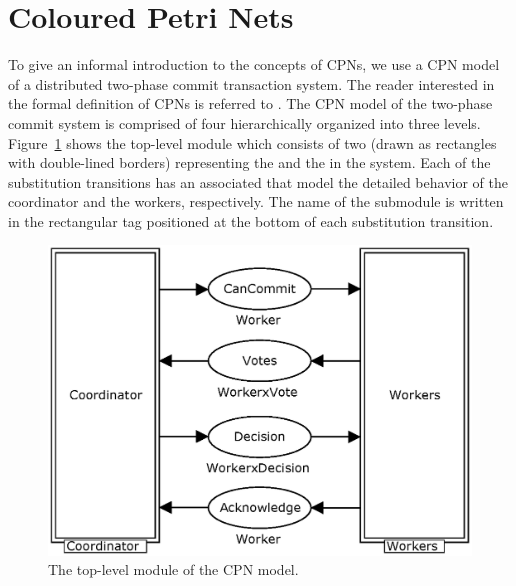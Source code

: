 \section{Coloured Petri Nets}
\label{sect:language}


To give an informal introduction to the concepts of CPNs, we use a CPN
model of a distributed two-phase commit transaction system. The reader
interested in the formal definition of CPNs is referred to
\cite{newcpnbook}. The CPN model of the two-phase commit system is
comprised of four  hierarchically organized into
three levels. Figure~\ref{fig:commit} shows the top-level module which
consists of two  (drawn as
rectangles with double-lined borders) representing the
 and the  in the system. Each of
the substitution transitions has an associated 
that model the detailed behavior of the coordinator and the workers,
respectively. The name of the submodule is written in the rectangular
tag positioned at the bottom of each substitution transition.

\begin{figure}[b]
\centering
\includegraphics[scale=.5]{figures/Commit.eps}
\caption{The top-level module of the CPN model.}
\label{fig:commit}
\end{figure}


